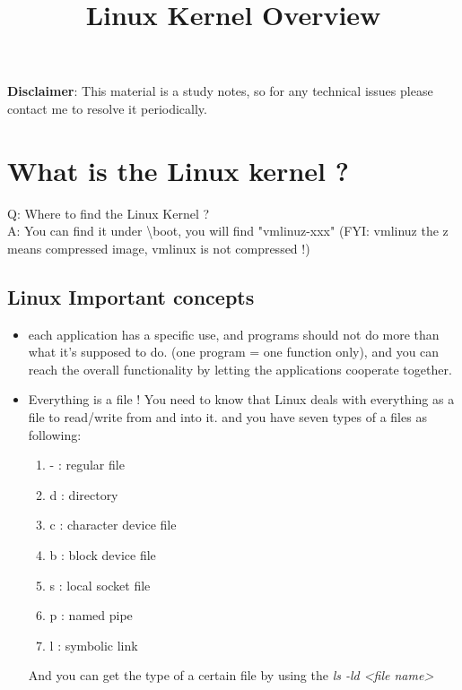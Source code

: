 \documentclass{article}
\title{\textbf{Linux Kernel Overview}}
\author{}
\date{}
\begin{document}
\textbf{Disclaimer}: This material is a study notes, so for any technical issues please contact me to resolve it periodically.

\begin{minipage}{\textwidth}
    \maketitle
\end{minipage}
\tableofcontents{}
\section{What is the Linux kernel ?}

Q: Where to find the Linux Kernel ?\\
A: You can find it under \textbackslash boot, you will find "vmlinuz-xxx" (FYI: vmlinuz the z means compressed image, vmlinux is not compressed !)

\subsection {Linux Important concepts}
\begin{itemize}
    \item each application has a specific use, and programs should not do more than what it's supposed to do. (one program = one function only), and you can reach the overall functionality by letting the applications cooperate together.
    \item Everything is a file !
    You need to know that Linux deals with everything as a file to read/write from and into it. and you have seven types of a files as following:
    \begin{enumerate}
        \item - : regular file
        \item d : directory
        \item c : character device file
        \item b : block device file
        \item s : local socket file
        \item p : named pipe
        \item l : symbolic link
    \end{enumerate}
    And you can get the type of a certain file by using the \textit{ls -ld <file name>}
    

\end{itemize}
\end{document}
